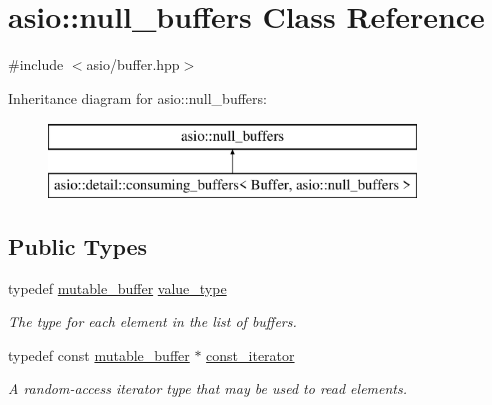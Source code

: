 \hypertarget{classasio_1_1null__buffers}{}\section{asio\+:\+:null\+\_\+buffers Class Reference}
\label{classasio_1_1null__buffers}


{\ttfamily \#include $<$asio/buffer.\+hpp$>$}

Inheritance diagram for asio\+:\+:null\+\_\+buffers\+:\begin{figure}[H]
\begin{center}
\leavevmode
\includegraphics[height=2.000000cm]{classasio_1_1null__buffers}
\end{center}
\end{figure}
\subsection*{Public Types}
\begin{DoxyCompactItemize}
\item 
typedef \hyperlink{classasio_1_1mutable__buffer}{mutable\+\_\+buffer} \hyperlink{classasio_1_1null__buffers_a3178c4016392be035c13149433de3d68}{value\+\_\+type}
\begin{DoxyCompactList}\small\item\em The type for each element in the list of buffers. \end{DoxyCompactList}\item 
typedef const \hyperlink{classasio_1_1mutable__buffer}{mutable\+\_\+buffer} $\ast$ \hyperlink{classasio_1_1null__buffers_abdfa728f93ea0d07637fd1183be3be28}{const\+\_\+iterator}
\begin{DoxyCompactList}\small\item\em A random-\/access iterator type that may be used to read elements. \end{DoxyCompactList}\end{DoxyCompactItemize}
